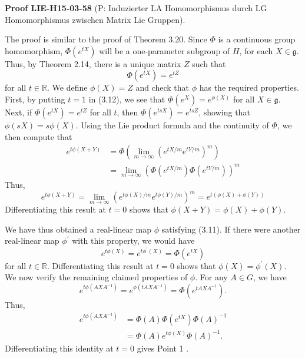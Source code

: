 \documentclass[10pt, letterpaper]{article}
\newcommand{\CustomHeading}[3]{%
  \par\medskip\noindent%
  \textbf{#1 #2} \textnormal{(#3)}.\enskip%
}
\newenvironment{PROOF}[2]{\begin{unitbox}\CustomHeading{Proof}{#1}{#2}}{\end{unitbox}}
\begin{document}
\begin{PROOF}{LIE-H15-03-58}{P: Induzierter LA Homomorphismus durch LG Homomorphismus zwischen Matrix Lie Gruppen}
The proof is similar to the proof of Theorem 3.20. Since $\Phi$ is a continuous group homomorphism, $\Phi\left(e^{t X}\right)$ will be a one-parameter subgroup of $H$, for each $X \in \mathfrak{g}$. Thus, by Theorem 2.14, there is a unique matrix $Z$ such that
$$
\Phi\left(e^{t X}\right)=e^{t Z}
$$
for all $t \in \mathbb{R}$. We define $\phi(X)=Z$ and check that $\phi$ has the required properties. First, by putting $t=1$ in (3.12), we see that $\Phi\left(e^{X}\right)=e^{\phi(X)}$ for all $X \in \mathfrak{g}$. Next, if $\Phi\left(e^{t X}\right)=e^{t Z}$ for all $t$, then $\Phi\left(e^{t s X}\right)=e^{t s Z}$, showing that $\phi(s X)=s \phi(X)$. Using the Lie product formula and the continuity of $\Phi$, we then compute that
$$
\begin{aligned}
e^{t \phi(X+Y)} & =\Phi\left(\lim _{m \rightarrow \infty}\left(e^{t X / m} e^{t Y / m}\right)^{m}\right) \\
& =\lim _{m \rightarrow \infty}\left(\Phi\left(e^{t X / m}\right) \Phi\left(e^{t Y / m}\right)\right)^{m}
\end{aligned}
$$
Thus,
$$
e^{t \phi(X+Y)}=\lim _{m \rightarrow \infty}\left(e^{t \phi(X) / m} e^{t \phi(Y) / m}\right)^{m}=e^{t(\phi(X)+\phi(Y))}
$$
Differentiating this result at $t=0$ shows that $\phi(X+Y)=\phi(X)+\phi(Y)$.

We have thus obtained a real-linear map $\phi$ satisfying (3.11). If there were another real-linear map $\phi^{\prime}$ with this property, we would have
$$
e^{t \phi(X)}=e^{t \phi^{\prime}(X)}=\Phi\left(e^{t X}\right)
$$
for all $t \in \mathbb{R}$. Differentiating this result at $t=0$ shows that $\phi(X)=\phi^{\prime}(X)$.\\
We now verify the remaining claimed properties of $\phi$. For any $A \in G$, we have
$$
e^{t \phi\left(A X A^{-1}\right)}=e^{\phi\left(t A X A^{-1}\right)}=\Phi\left(e^{t A X A^{-1}}\right) .
$$
Thus,
$$
\begin{aligned}
e^{t \phi\left(A X A^{-1}\right)} & =\Phi(A) \Phi\left(e^{t X}\right) \Phi(A)^{-1} \\
& =\Phi(A) e^{t \phi(X)} \Phi(A)^{-1} .
\end{aligned}
$$
Differentiating this identity at $t=0$ gives Point 1 .



\end{PROOF}
\end{document}
